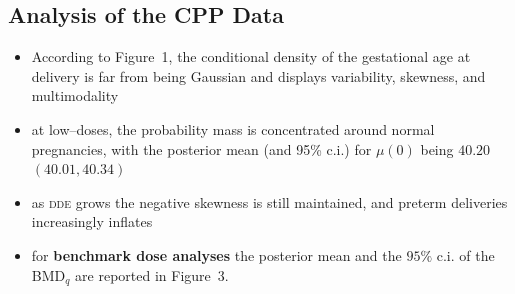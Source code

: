 \documentclass[a0,portrait]{a0poster}
\begin{document}
\begin{multicols}{2}
\vspace{-0.5cm}

\color{DarkRed}
\section*{Analysis of the CPP Data}
\label{cpp}
\color{Black}


\begin{itemize}
\item According to Figure~1, the conditional density of the  gestational age at delivery is far from being Gaussian and displays variability, skewness, and multimodality 
\item at low--doses, the probability mass is concentrated around normal pregnancies, with the posterior mean (and 95\% c.i.) for $\mu(0)$ being $40.20$  $(40.01,40.34)$
\item as \textsc{dde} grows the negative skewness is still maintained, and preterm deliveries increasingly inflates
\item for {\bf benchmark dose analyses} the posterior mean and the $95\%$ c.i. of the BMD$_q$ are reported in Figure~3.
\end{itemize}



\end{multicols}
\end{document}

